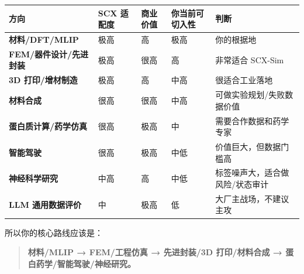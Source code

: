 \documentclass[
  12pt,
]{ctexart}
\begin{document}
\begin{longtable}[]{@{}
  >{\raggedright\arraybackslash}p{}
  >{\raggedleft\arraybackslash}p{}
  >{\raggedleft\arraybackslash}p{}
  >{\raggedleft\arraybackslash}p{}
  >{\raggedright\arraybackslash}p{}@{}}
\toprule\noalign{}
\begin{minipage}[b]{\linewidth}\raggedright
方向
\end{minipage} & \begin{minipage}[b]{\linewidth}\raggedleft
SCX 适配度
\end{minipage} & \begin{minipage}[b]{\linewidth}\raggedleft
商业价值
\end{minipage} & \begin{minipage}[b]{\linewidth}\raggedleft
你当前可切入性
\end{minipage} & \begin{minipage}[b]{\linewidth}\raggedright
判断
\end{minipage} \\
\midrule\noalign{}
\endhead
\bottomrule\noalign{}
\endlastfoot
\textbf{材料/DFT/MLIP} & 极高 & 高 & 极高 & 你的根据地 \\
\textbf{FEM/器件设计/先进封装} & 极高 & 很高 & 高 & 非常适合 SCX-Sim \\
\textbf{3D 打印/增材制造} & 极高 & 高 & 中高 & 很适合工业落地 \\
\textbf{材料合成} & 很高 & 很高 & 中高 & 可做实验规划/失败数据价值 \\
\textbf{蛋白质计算/药学仿真} & 很高 & 极高 & 中 &
需要合作数据和药学专家 \\
\textbf{智能驾驶} & 很高 & 极高 & 中低 & 价值巨大，但数据门槛高 \\
\textbf{神经科学研究} & 中高 & 高 & 中低 &
标签噪声大，适合做风险/状态审计 \\
\textbf{LLM 通用数据评价} & 中 & 极高 & 低 & 大厂主战场，不建议主攻 \\
\end{longtable}

所以你的核心路线应该是：

\begin{quote}
\textbf{材料/MLIP → FEM/工程仿真 → 先进封装/3D 打印/材料合成 →
蛋白药学/智能驾驶/神经研究。}
\end{quote}
\end{document}

